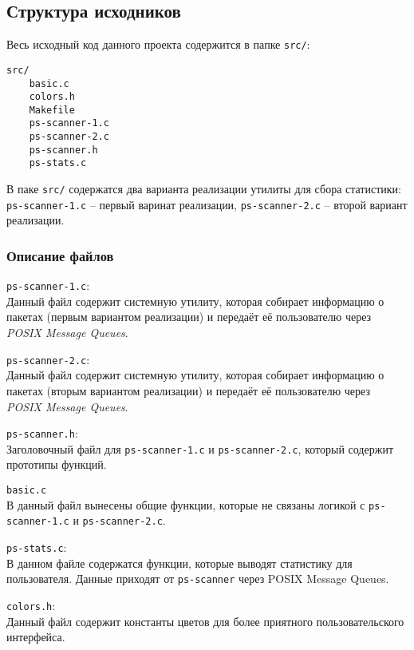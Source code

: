 \subsection{Структура исходников}

Весь исходный код данного проекта содержится в папке \verb|src/|:

\begin{lstlisting}
src/
    basic.c
    colors.h
    Makefile
    ps-scanner-1.c
    ps-scanner-2.c
    ps-scanner.h
    ps-stats.c
\end{lstlisting}

В паке \verb|src/| содержатся два варианта реализации утилиты для сбора статистики: \verb|ps-scanner-1.c| -- первый варинат реализации, \verb|ps-scanner-2.c| -- второй вариант реализации.

\subsubsection*{Описание файлов}

\verb|ps-scanner-1.c|:\\
Данный файл содержит системную утилиту, которая собирает информацию о пакетах (первым вариантом реализации) и передаёт её пользователю через \textit{POSIX Message Queues}.

\newpage

\verb|ps-scanner-2.c|:\\
Данный файл содержит системную утилиту, которая собирает информацию о пакетах (вторым вариантом реализации) и передаёт её пользователю через \textit{POSIX Message Queues}.

\linespace

\verb|ps-scanner.h|:\\
Заголовочный файл для \verb|ps-scanner-1.c| и \verb|ps-scanner-2.c|, который содержит прототипы функций.

\linespace

\verb|basic.c|\\
В данный файл вынесены общие функции, которые не связаны логикой с \verb|ps-scanner-1.c| и \verb|ps-scanner-2.c|.

\linespace

\verb|ps-stats.c|:\\
В данном файле содержатся функции, которые выводят статистику для пользователя. Данные приходят от \verb|ps-scanner| через POSIX Message Queues.

\linespace

\verb|colors.h|:\\
Данный файл содержит константы цветов для более приятного пользовательского интерфейса.
